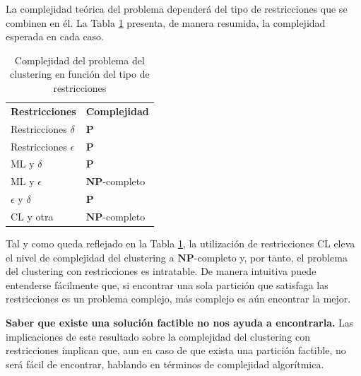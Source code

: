 La complejidad teórica del problema dependerá del tipo de restricciones que se combinen en él. La Tabla \ref{tab:tabla1} presenta, de manera resumida, la complejidad esperada en cada caso. 

\begin{table}[h]
	\centering
	\setlength{\arrayrulewidth}{1mm}
	\setlength{\tabcolsep}{10pt}
	\renewcommand{\arraystretch}{1}
	
	\begin{tabular}{ >{\centering\arraybackslash}m{4cm}  >{\centering\arraybackslash}m{4cm} }
		\hline
		\rowcolor{black}
		\multicolumn{2}{c}{\bf \color{white}{Complejidad del clustering con restricciones}}\\
		\hline
		\rowcolor{gray!50}
		\textbf{Restricciones} & \textbf{Complejidad} \\
		Restricciones $\delta$ & $\mathbf{P}$ \\
		Restricciones $\epsilon$ & $\mathbf{P}$ \\
		\acs{ML} y $\delta$ & $\mathbf{P}$ \\
		\acs{ML} y $\epsilon$ & $\mathbf{NP}$-completo \\
		$\epsilon$ y $\delta$ & $\mathbf{P}$ \\
		\acs{CL} y otra & $\mathbf{NP}$-completo \\
		\hline
		
	\end{tabular}
	\caption[Complejidad del problema del clustering en función del tipo de restricciones]{Complejidad del problema del clustering en función del tipo de restricciones \cite{Survey:2007}}
	\label{tab:tabla1}
\end{table}

Tal y como queda reflejado en la Tabla \ref{tab:tabla1}, la utilización de restricciones \acf{CL} eleva el nivel de complejidad del clustering a $\mathbf{NP}$-completo y, por tanto, el problema del clustering con restricciones es intratable. De manera intuitiva puede entenderse fácilmente que, si encontrar una sola partición que satisfaga las restricciones es un problema complejo, más complejo es aún encontrar la mejor. 

\begin{observacion}
	
	\textbf{Saber que existe una solución factible no nos ayuda a encontrarla.} Las implicaciones de este resultado sobre la complejidad del clustering con restricciones implican que, aun en caso de que exista una partición factible, no será fácil de encontrar, hablando en términos de complejidad algorítmica. \cite{Survey:2007}
	\label{ob:observacion34}
	
\end{observacion} 

